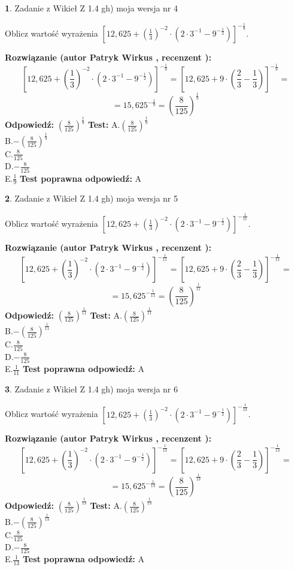 \documentclass[12pt, a4paper]{article}
\theoremstyle{definition} %
\newtheorem{zad}{}
\newcommand{\zadStart}[1]{\begin{zad}#1\newline}
\newcommand{\zadStop}{\end{zad}}
\newcommand{\rozwStart}[2]{\noindent \textbf{Rozwiązanie (autor #1 , recenzent #2): }\newline}
\newcommand{\rozwStop}{\newline}
\newcommand{\odpStart}{\noindent \textbf{Odpowiedź:}\newline}
\newcommand{\odpStop}{\newline}
\newcommand{\testStart}{\noindent \textbf{Test:}\newline}
\newcommand{\testStop}{\newline}
\newcommand{\kluczStart}{\noindent \textbf{Test poprawna odpowiedź:}\newline}
\newcommand{\kluczStop}{\newline}
\begin{document}
\zadStart{Zadanie z Wikieł Z 1.4 gh) moja wersja nr 4}

Oblicz wartość wyrażenia $[12,625+(\frac{1}{3})^{-2}\cdot(2\cdot 3^{-1} - 9^{-\frac{1}{2}})]^{-\frac{1}{9}}$.
\zadStop
\rozwStart{Patryk Wirkus}{}
$$[12,625+(\frac{1}{3})^{-2}\cdot(2\cdot 3^{-1} - 9^{-\frac{1}{2}})]^{-\frac{1}{9}} = [12,625+9\cdot (\frac{2}{3}-\frac{1}{3})]^{-\frac{1}{9}} =$$
$$=15,625^{-\frac{1}{9}} = (\frac{8}{125})^\frac{1}{9}$$
\rozwStop
\odpStart
$(\frac{8}{125})^\frac{1}{9}$
\odpStop
\testStart
A.$(\frac{8}{125})^\frac{1}{9}$\\ B.$-(\frac{8}{125})^\frac{1}{9}$\\ C.$\frac{8}{125}$\\ D.$-\frac{8}{125}$\\ E.$\frac{1}{9}$
\testStop
\kluczStart
A
\kluczStop



\zadStart{Zadanie z Wikieł Z 1.4 gh) moja wersja nr 5}

Oblicz wartość wyrażenia $[12,625+(\frac{1}{3})^{-2}\cdot(2\cdot 3^{-1} - 9^{-\frac{1}{2}})]^{-\frac{1}{11}}$.
\zadStop
\rozwStart{Patryk Wirkus}{}
$$[12,625+(\frac{1}{3})^{-2}\cdot(2\cdot 3^{-1} - 9^{-\frac{1}{2}})]^{-\frac{1}{11}} = [12,625+9\cdot (\frac{2}{3}-\frac{1}{3})]^{-\frac{1}{11}} =$$
$$=15,625^{-\frac{1}{11}} = (\frac{8}{125})^\frac{1}{11}$$
\rozwStop
\odpStart
$(\frac{8}{125})^\frac{1}{11}$
\odpStop
\testStart
A.$(\frac{8}{125})^\frac{1}{11}$\\ B.$-(\frac{8}{125})^\frac{1}{11}$\\ C.$\frac{8}{125}$\\ D.$-\frac{8}{125}$\\ E.$\frac{1}{11}$
\testStop
\kluczStart
A
\kluczStop



\zadStart{Zadanie z Wikieł Z 1.4 gh) moja wersja nr 6}

Oblicz wartość wyrażenia $[12,625+(\frac{1}{3})^{-2}\cdot(2\cdot 3^{-1} - 9^{-\frac{1}{2}})]^{-\frac{1}{13}}$.
\zadStop
\rozwStart{Patryk Wirkus}{}
$$[12,625+(\frac{1}{3})^{-2}\cdot(2\cdot 3^{-1} - 9^{-\frac{1}{2}})]^{-\frac{1}{13}} = [12,625+9\cdot (\frac{2}{3}-\frac{1}{3})]^{-\frac{1}{13}} =$$
$$=15,625^{-\frac{1}{13}} = (\frac{8}{125})^\frac{1}{13}$$
\rozwStop
\odpStart
$(\frac{8}{125})^\frac{1}{13}$
\odpStop
\testStart
A.$(\frac{8}{125})^\frac{1}{13}$\\ B.$-(\frac{8}{125})^\frac{1}{13}$\\ C.$\frac{8}{125}$\\ D.$-\frac{8}{125}$\\ E.$\frac{1}{13}$
\testStop
\kluczStart
A
\kluczStop
\end{document}
